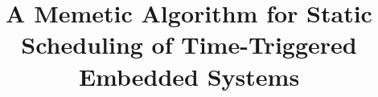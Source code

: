 \documentclass[10pt,journal]{IEEEtran}
\theoremstyle{remark}
\begin{document}
%
\title{A Memetic Algorithm for Static Scheduling of Time-Triggered Embedded Systems}










% 
\end{document}

